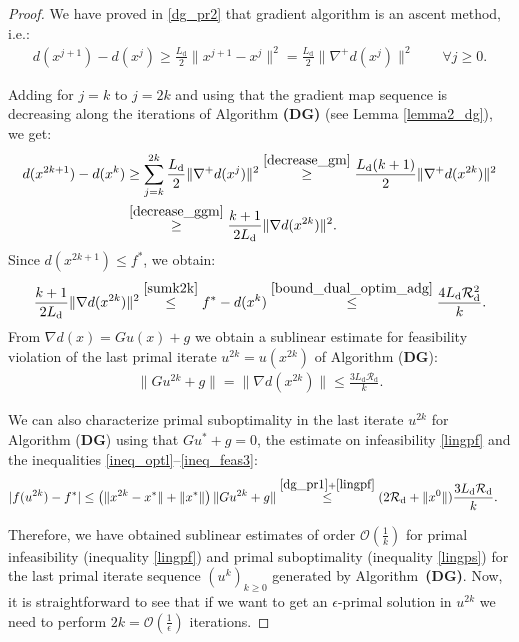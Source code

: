 \documentclass{gOMS2e}
\theoremstyle{plain}
\theoremstyle{definition}
\theoremstyle{remark}
\begin{document}
\begin{proof}
We have proved in \eqref{dg_pr2} that gradient algorithm is an ascent method, i.e.:
\begin{align*}
d(x^{j+1}) - d(x^j)  \geq  \frac{L_\text{d}}{2}  \|x^{j+1} - x^j \|^2 =  \frac{L_\text{d}}{2} \|\nabla^+ d(x^j)\|^2   \qquad \forall j \geq 0.
\end{align*}

\noindent  Adding for $j=k$ to $j=2k$ and using that the gradient map sequence is decreasing along the iterations of Algorithm {\bf (DG)} (see Lemma \ref{lemma2_dg}),  we get:
\begin{align}
\label{sumk2k} d(x^{2k+1}) -  d(x^{k})  & \geq  \sum_{j=k}^{2k}
\frac{L_\text{d}}{2} \|\nabla^+ d(x^j)\|^2 \overset{\eqref{decrease_gm}}{\geq} \frac{L_\text{d}(k+1)}{2} \|\nabla^+ d(x^{2k})\|^2  \nonumber \\
& \overset{\eqref{decrease_ggm}}{\geq} \frac{k+1}{2L_\text{d}} \|\nabla d(x^{2k})\|^2.
\end{align}
Since $d(x^{2k+1}) \leq f^*$, we obtain:
\[ \frac{k+1}{2L_\text{d}} \|\nabla d(x^{2k})\|^2  \overset{\eqref{sumk2k}}{\leq} f^* -
d(x^{k}) \overset{\eqref{bound_dual_optim_adg}}{\leq} \frac{4
L_\text{d} \mathcal{R}_\text{d}^2}{k}.   \] From $\nabla d(x) = G
u(x) + g$  we obtain a sublinear estimate for feasibility violation
of the last primal iterate $u^{2k} = u(x^{2k})$ of Algorithm
(\textbf{DG}):
\begin{align}
\label{lingpf} \|G u^{2k} + g \| = \|\nabla d(x^{2k})\|   \leq  \frac{3 L_\text{d} \mathcal{R}_\text{d}}{k}.
\end{align}

\noindent We can also characterize primal suboptimality in the last
iterate $u^{2k} $ for Algorithm (\textbf{DG}) using that $G
u^* + g=0$, the  estimate on infeasibility  \eqref{lingpf}  and the
inequalities \eqref{ineq_optl}--\eqref{ineq_feas3}:
\begin{align}
\label{lingps} |f(u^{2k}) - f^*| & \leq   \left( \|x^{2k} - x^*\| +
\|x^*\|
\right ) \|G u^{2k} + g \|  \overset{\eqref{dg_pr1} + \eqref{lingpf}}{\leq}  (2
\mathcal{R}_\text{d} + \|x^0\|) \frac{3 L_\text{d}
\mathcal{R}_\text{d}}{k}.
\end{align}

\noindent Therefore, we have obtained sublinear estimates  of order
$\mathcal{O}(\frac{1}{k})$ for primal infeasibility (inequality
\eqref{lingpf}) and primal suboptimality (inequality \eqref{lingps})
for the last primal iterate sequence $(u^k)_{k \geq 0}$ generated by
Algorithm~\textbf{(DG)}. Now, it is  straightforward to see that if
we want to get an $\epsilon$-primal solution in $u^{2k}$ we need to
perform $2k = {\mathcal O} (\frac{1}{\epsilon})$ iterations.
\end{proof}
\end{document}
